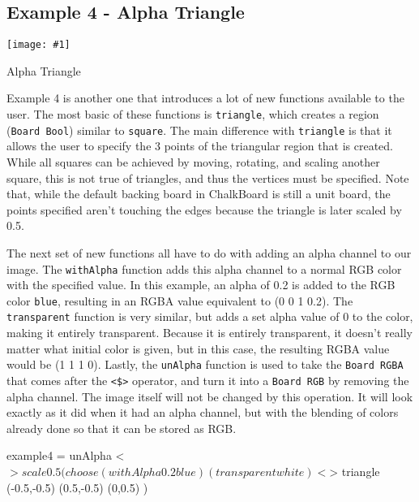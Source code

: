 \documentclass{article}
\newcommand{\floatimg}[3]{%
\begin{floatingfigure}[r]{0.35\textwidth} 
\texttt{[image: \#1]}
\caption{#2}\label{#3}
\end{floatingfigure}}
\begin{document}
\newpage
\subsection{Example 4 - Alpha Triangle}

\floatimg{ex4.png}{Alpha Triangle}{fig:ex4}%
Example 4 is another one that introduces a lot of new functions available to
the user. The most basic of these functions is \texttt{triangle}, which creates
a region (\texttt{Board Bool}) similar to \texttt{square}. The main difference with
\texttt{triangle} is that it allows the user to specify the 3 points of the triangular
region that is created. While all squares can be achieved by moving, rotating, and scaling
another square, this is not true of triangles, and thus the vertices must be specified.
Note that, while the default backing board in ChalkBoard is still a unit board, the points
specified aren't touching the edges because the triangle is later scaled by 0.5.

The next set of new functions all have to do with adding an alpha channel to our image.
The \texttt{withAlpha} function adds this alpha channel to a normal RGB color with the
specified value. In this example, an alpha of 0.2 is added to the RGB color \texttt{blue},
resulting in an RGBA value equivalent to (0 0 1 0.2). The \texttt{transparent} function
is very similar, but adds a set alpha value of 0 to the color, making it entirely
transparent. Because it is entirely transparent, it doesn't really matter what initial
color is given, but in this case, the resulting RGBA value would be (1 1 1 0). Lastly,
the \texttt{unAlpha} function is used to take the \texttt{Board RGBA} that comes after
the \texttt{<\$>} operator, and turn it into a \texttt{Board RGB} by removing the alpha
channel. The image itself will not be changed by this operation. It will look exactly as
it did when it had an alpha channel, but with the blending of colors already done so that
it can be stored as RGB.

\vspace{0.1in}

\begin{DSL}
example4 = unAlpha <$> scale 0.5 ( choose (withAlpha 0.2 blue) 
                                          (transparent white) 
                                          <$> triangle (-0.5,-0.5)
                                                       (0.5,-0.5)
                                                       (0,0.5) )
\end{DSL}
\end{document}
